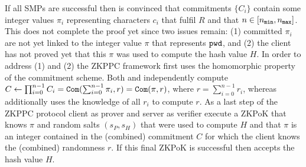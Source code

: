 If all \acp{SMP} are successful then \Server is convinced that commitments $\{C_i\}$ contain some integer values $\pi_i$ representing characters $c_i$ that fulfil $R$ and that $n\in[{n_\mathtt{min}},{n_\mathtt{max}}]$. 
This does not complete the proof yet since two issues remain: 
(1) committed $\pi_i$ are not yet linked to the integer value $\pi$ that represents $\mathtt{pwd}$, and 
(2) the client has not proved yet that this $\pi$ was used to compute the hash value $H$. 
In order to address (1) and (2) the \ac{ZKPPC} framework first uses the homomorphic property of the commitment scheme.
Both \Client and \Server independently compute $C\gets\prod_{i=0}^{n-1}C_i=\mathtt{Com}(\sum_{i=0}^{n-1} \pi_i,r)= \mathtt{Com}(\pi, r)$, where $r = \sum_{i=0}^{n-1} r_i$, whereas \Client additionally uses the knowledge of all $r_i$ to compute $r$. 
As a last step of the \ac{ZKPPC} protocol client \Client as prover and server \Server as verifier execute a \ac{ZKPoK} that \Client knows $\pi$ and random salts $(s_P, s_H)$ that were used to compute $H$ and that $\pi$ is an integer contained in the (combined) commitment $C$ for which the client knows the (combined) randomness $r$. 
If this final \ac{ZKPoK} is successful then \Server accepts the hash value $H$.



